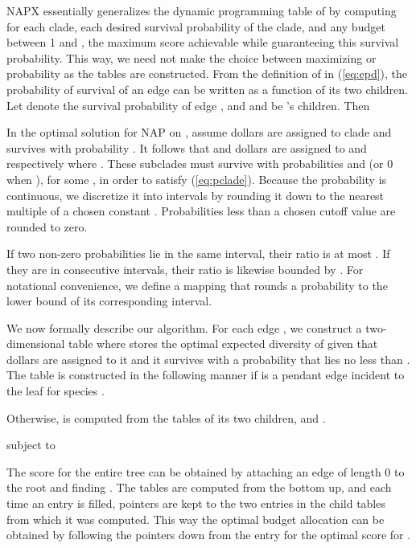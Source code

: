 \documentclass[10pt]{llncs}       \usepackage{graphicx,subfigure}
\begin{document}
NAPX essentially generalizes the dynamic programming table of
\cite{pardi07} by computing for each clade, each desired survival probability
of the clade, and any budget between 1 and , the maximum 
score achievable while guaranteeing this survival probability.
  This way, we need not make the 
choice between maximizing  or probability as the tables
are constructed.  From the definition of
 in (\ref{eq:epd}), the probability of survival of
an edge can be written as a function of its two children.  Let 
denote the survival probability of edge , and  and  be 's children.
Then
  
In the optimal solution for NAP on ,
 assume  dollars are assigned to clade  and 
 survives with probability
.  It follows that  and  dollars
are assigned to  and  respectively where
.  These subclades must survive with probabilities 
 and  (or 0 when ), 
for some , in order to 
satisfy (\ref{eq:pclade}). Because 
the probability is continuous, we discretize it into intervals by rounding it
down to the nearest
multiple of a chosen constant . Probabilities less than a chosen 
cutoff value  are rounded to zero.

If two non-zero probabilities lie in the same interval, their ratio is at most 
. If they are in consecutive intervals, their ratio is likewise bounded
by .  For notational convenience, we define a mapping 
that rounds a probability to the lower bound of its corresponding interval.

We now formally describe our algorithm.  For each edge , we construct
a two-dimensional table  where  stores the optimal expected
diversity of  given that  dollars are assigned to it and
 it survives with a probability that lies no less than .
The table is constructed in the following manner if  is a pendant edge
incident to the leaf for species .

Otherwise,  is computed from the tables of its two children,  and 
.

subject to 


The  score
for the entire tree can be obtained by attaching an edge  of length
0 to the root and finding .  
The tables are computed from the bottom up, and
each time an entry is filled, pointers are kept to the two entries 
in the child tables from which it was computed.  This way the optimal
budget allocation can be obtained by following the pointers down from 
the entry for the optimal score for . 
\end{document}

